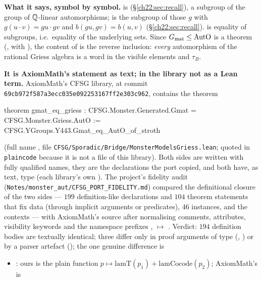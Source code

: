 \begin{dictionary}
\textbf{What it says, symbol by symbol.}   is
 (\S\ref{ch22:sec:recall}), a subgroup of the group
 of ${\mathbb{Q}}$-linear automorphisms;  is the subgroup of those $g$ with
$g(u\cdot v)=gu\cdot gv$ and $b(gu,gv)=b(u,v)$ (\S\ref{ch22:sec:recall}).  \lean{=} is equality of subgroups, i.e.\ equality of
the underlying sets.  Since $G_{\mathrm{mat}}\le\mathrm{AutO}$ is a theorem (, with
), the content of  is the reverse inclusion: \emph{every} automorphism of the rational
Griess algebra is a word in the visible elements and $\tau_B$.

\textbf{It is AxiomMath's statement as text; in the library not as a Lean term.}  AxiomMath's CFSG
library, at commit \texttt{69cb972f587a3ecc035e092253167ff2e303c962}, contains the theorem
\begin{plaincode}
theorem gmat_eq_griess :
    CFSG.Monster.Generated.Gmat = CFSG.Monster.Griess.AutO :=
  CFSG.YGroups.Y443.Gmat_eq_AutO_of_stroth
\end{plaincode}
(full name , file
\texttt{CFSG/Sporadic/Bridge/MonsterModelsGriess.lean}; quoted in \texttt{plaincode} because it is not a file of this
library).  Both sides are written with fully qualified names, they are the declarations the port copied, and both have,
as text, type  (each library's own ).  The project's fidelity audit (\texttt{Notes/monster\_aut/CFSG\_PORT\_FIDELITY.md})
compared the definitional closure of the two sides --- $199$ definition-like declarations and $104$ theorem
statements that fix data (through implicit arguments or  predicates), $46$ instances, and the
 contexts --- with AxiomMath's source after normalising comments, attributes, visibility keywords and the
namespace prefixes ,  $\mapsto$ .  Verdict:
$194$ definition bodies are textually identical; three differ only in proof arguments of  type (,
) or by a parser artefact (); the one genuine difference is
\begin{itemize}
\item {}: ours is the plain function $p\mapsto\mathrm{lamT}(p_1)+\mathrm{lamCocode}(p_2)$; AxiomMath's is

\end{itemize}
\end{dictionary}
